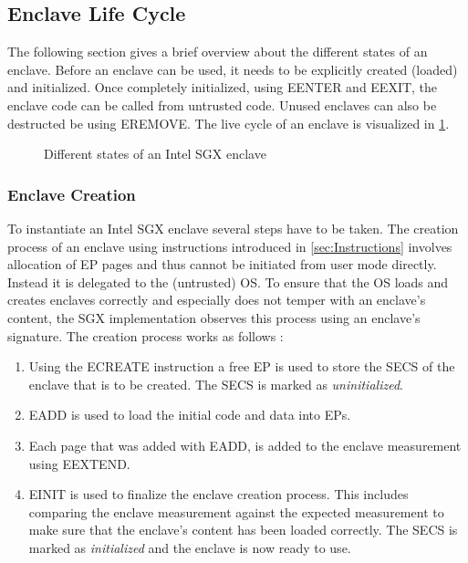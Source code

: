 \subsection{Enclave Life Cycle}
The following section gives a brief overview about the different states of an enclave. Before an enclave can be used, it needs to be explicitly created (loaded) and initialized.
Once completely initialized, using EENTER and EEXIT, the enclave code can be called from untrusted code. Unused enclaves can also be destructed be using EREMOVE. The live cycle 
of an enclave is visualized in \cref{fig:enclaveLifeCycle}.

\begin{figure}[h]
    \centering
    \caption{Different states of an Intel SGX enclave \cite{Costan2016IntelSE}}
    \label{fig:enclaveLifeCycle}
\end{figure}

\subsubsection{Enclave Creation}
To instantiate an Intel SGX enclave several steps have to be taken. The creation process of an enclave using instructions introduced in \cref{sec:Instructions} involves allocation
of EP pages and thus cannot be initiated from user mode directly. Instead it is delegated to the (untrusted) OS. To ensure that the OS loads and creates enclaves correctly and
especially does not temper with an enclave's content, the SGX implementation observes this process using an enclave's signature. The creation process works as follows
\cite{Costan2016IntelSE}:
\begin{enumerate}
    \item Using the ECREATE instruction a free EP is used to store the SECS of the enclave that is to be created. The SECS is marked as \textit{uninitialized}.
    \item EADD is used to load the initial code and data into EPs.
    \item Each page that was added with EADD, is added to the enclave measurement using EEXTEND.
    \item EINIT is used to finalize the enclave creation process. This includes comparing the enclave measurement against the expected measurement to make sure that the enclave's
          content has been loaded correctly. The SECS is marked as \textit{initialized} and the enclave is now ready to use.
\end{enumerate}

